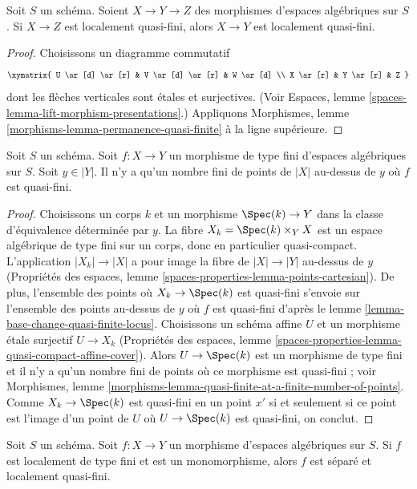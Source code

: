 \begin{lemma}
\label{lemma-permanence-quasi-finite}
Soit $S$ un schéma.
Soient $X \to Y \to Z$ des morphismes d'espaces algébriques sur $S$.
Si $X \to Z$ est localement quasi-fini, alors $X \to Y$
est localement quasi-fini.
\end{lemma}

\begin{proof}
Choisissons un diagramme commutatif
$$
\xymatrix{
U \ar[d] \ar[r] & V \ar[d] \ar[r] & W \ar[d] \\
X \ar[r] & Y \ar[r] & Z
}
$$
dont les flèches verticales sont étales et surjectives. (Voir
Espaces, lemme \ref{spaces-lemma-lift-morphism-presentations}.)
Appliquons
Morphismes, lemme \ref{morphisms-lemma-permanence-quasi-finite}
à la ligne supérieure.
\end{proof}

\begin{lemma}
\label{lemma-quasi-finite-at-a-finite-number-of-points}
Soit $S$ un schéma. Soit $f : X \to Y$ un morphisme de type fini
d'espaces algébriques sur $S$. Soit $y \in |Y|$.
Il n'y a qu'un nombre fini
de points de $|X|$ au-dessus de $y$ où $f$ est quasi-fini.
\end{lemma}

\begin{proof}
Choisissons un corps $k$ et un morphisme $\Spec(k) \to Y$ dans la classe
d'équivalence déterminée par $y$. La fibre $X_k = \Spec(k) \times_Y X$ est un
espace algébrique de type fini sur un corps, donc en particulier quasi-compact.
L'application $|X_k| \to |X|$ a pour image la fibre de $|X| \to |Y|$
au-dessus de $y$ (Propriétés des espaces, lemme
\ref{spaces-properties-lemma-points-cartesian}).
De plus, l'ensemble des points où $X_k \to \Spec(k)$ est
quasi-fini s'envoie sur l'ensemble des points au-dessus de $y$ où
$f$ est quasi-fini d'après le lemme \ref{lemma-base-change-quasi-finite-locus}.
Choisissons un schéma affine $U$ et un morphisme étale surjectif $U \to X_k$
(Propriétés des espaces, lemme
\ref{spaces-properties-lemma-quasi-compact-affine-cover}).
Alors $U \to \Spec(k)$ est un morphisme de type fini et il n'y a qu'un
nombre fini de points où ce morphisme est quasi-fini ;
voir Morphismes, lemme
\ref{morphisms-lemma-quasi-finite-at-a-finite-number-of-points}.
Comme $X_k \to \Spec(k)$ est quasi-fini en un point $x'$ si et seulement
si ce point est l'image d'un point de $U$ où $U \to \Spec(k)$ est
quasi-fini, on conclut.
\end{proof}

\begin{lemma}
\label{lemma-monomorphism-loc-finite-type-loc-quasi-finite}
Soit $S$ un schéma.
Soit $f : X \to Y$ un morphisme d'espaces algébriques sur $S$.
Si $f$ est localement de type fini et est un monomorphisme, alors $f$
est séparé et localement quasi-fini.
\end{lemma}

